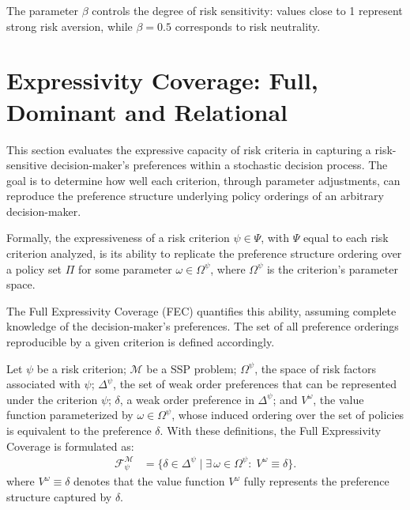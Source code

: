 \documentclass[runningheads]{llncs}
\begin{document}
The parameter $\beta$ controls the degree of risk sensitivity: values close to 1 represent strong risk aversion, while $\beta = 0.5$ corresponds to risk neutrality.

\section{Expressivity Coverage: Full, Dominant and Relational}\label{sec:expressivity}

This section evaluates the expressive capacity of risk criteria in capturing a risk-sensitive decision-maker’s preferences within a stochastic decision process. The goal is to determine how well each criterion, through parameter adjustments, can reproduce the preference structure underlying policy orderings of an arbitrary decision-maker.

Formally, the expressiveness of a risk criterion $\psi \in \Psi$, with $\Psi$ equal to each risk criterion analyzed, is its ability to replicate the preference structure ordering over a policy set $\Pi$ for some parameter $\omega \in \Omega^\psi$, where $\Omega^\psi$ is the criterion’s parameter space.

The Full Expressivity Coverage (FEC) quantifies this ability, assuming complete knowledge of the decision-maker’s preferences. The set of all preference orderings reproducible by a given criterion is defined accordingly.

\begin{definition}
    Let $\psi$ be a risk criterion; ${\mathcal{M}}$ be a SSP problem; $\Omega^{\psi}$, the space of risk factors associated with $\psi$; $\Delta^{\psi}$, the set of weak order preferences that can be represented under the criterion $\psi$; $\delta$, a weak order preference in $\Delta^{\psi}$; and $V^{\omega}$, the value function parameterized by $\omega \in \Omega^{\psi}$, whose induced ordering over the set of policies is equivalent to the preference $\delta$. With these definitions, the Full Expressivity Coverage is formulated as:
    \begin{equation}
        \begin{aligned}
        \mathcal{F}^{\mathcal{M}}_\psi
        &= \bigl\{\delta\in\Delta^\psi \mid \exists\,\omega\in\Omega^\psi:\;V^\omega\equiv\delta\bigr\}.
        \end{aligned}
    \end{equation}
    where $V^\omega\equiv\delta$ denotes that the value function $V^\omega$ fully represents the preference structure captured by $\delta$.
\end{definition}
\end{document}
